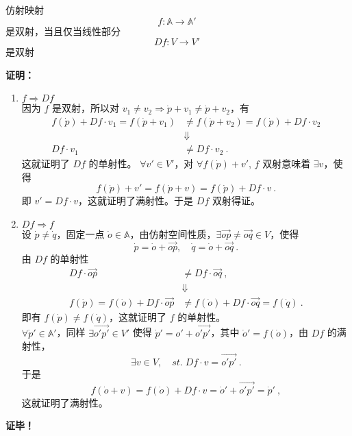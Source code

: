 \begin{theorem}{}\label{the_AfSp_1}
仿射映射
\begin{equation}
f:\mathbb A\rightarrow\mathbb A'~
\end{equation}
是双射，当且仅当线性部分
\begin{equation}
Df:V\rightarrow V'~
\end{equation}
是双射
\end{theorem}
\textbf{证明：}
\begin{enumerate}
\item $f\Rightarrow Df$\\

因为 $f$ 是双射，所以对 $v_1\neq v_2\Rightarrow \dot p+v_1\neq\dot p+v_2$，有
\begin{equation}
\begin{aligned}
f(\dot p)+Df\cdot v_1=f(\dot p+v_1)&\neq f(\dot p+v_2)=f(\dot p)+Df\cdot v_2\\
&\Downarrow\\
Df\cdot v_1&\neq Df\cdot v_2~.
\end{aligned}
\end{equation}
这就证明了 $Df$ 的单射性。  $\forall  v'\in V'$，对 $\forall f(\dot p)+v'$, $f$ 双射意味着 $\exists v$，使得 
\begin{equation}
f(\dot p)+v'=f(\dot p+v)=f(\dot p)+Df\cdot v~.
\end{equation}
即 $v'=Df\cdot v$，这就证明了满射性。于是 $Df$ 双射得证。
\item $Df\Rightarrow f$\\
设 $\dot p\neq \dot q$，固定一点 $\dot o\in \mathbb A$，由仿射空间性质，$\exists \overrightarrow{op}\neq\overrightarrow{oq}\in V$，使得 
\begin{equation}
\dot p=\dot o+\overrightarrow{op},\quad\dot q=\dot o+\overrightarrow{oq} ~.
\end{equation}
由 $Df$ 的单射性
\begin{equation}
\begin{aligned}
Df\cdot \overrightarrow{op}&\neq Df\cdot \overrightarrow{oq}~,\\
&\Downarrow\\
f(\dot p)=f(\dot o)+Df\cdot \overrightarrow{op}&\neq f(\dot o)+Df\cdot \overrightarrow{oq}=f(\dot q)~.
\end{aligned}
\end{equation}
即有 $f(\dot p)\neq f(\dot q)$，这就证明了 $f$ 的单射性。\\

$\forall \dot p'\in\mathbb A'$，同样 $\exists\overrightarrow{o'p'}\in V'$ 使得 $\dot p'=o'+\overrightarrow{o'p'}$，其中 $\dot o'=f(\dot o)$，由 $Df$ 的满射性，
\begin{equation}
\exists v\in V,\quad st.\; Df\cdot v=\overrightarrow{o'p'}~.
\end{equation}
于是
\begin{equation}
f(\dot o+v)=f(\dot o)+Df\cdot v=\dot o'+\overrightarrow{o'p'}=\dot p'~,
\end{equation}
这就证明了满射性。
\end{enumerate}
\textbf{证毕！}

